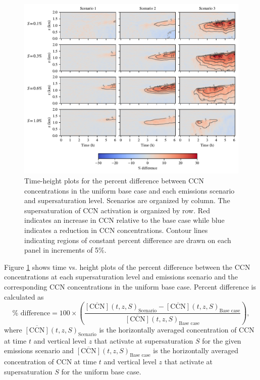 \documentclass[journal abbreviation, manuscript]{copernicus}
\begin{document}
\begin{figure}[!h]
	\centering
	\includegraphics[]{figures/height-time-ccn-pdiff-multi-scenario.pdf}
	\caption{Time-height plots for the percent difference between CCN concentrations in the uniform base case and each emissions scenario and supersaturation level. Scenarios are organized by column. The supersaturation of CCN activation is organized by row. Red indicates an increase in CCN relative to the base case while blue indicates a reduction in CCN concentrations. Contour lines indicating regions of constant percent difference are drawn on each panel in increments of 5\%.}
	\label{fig:time-height-ccn-pdiff}
\end{figure} 

Figure \ref{fig:time-height-ccn-pdiff} shows time vs. height plots of the percent difference between the CCN concentrations at each supersaturation level and emissions scenario and the corresponding CCN concentrations in the uniform base case. Percent difference is calculated as 
\begin{equation}
    \% \text{ difference} = 100\times\left(\frac{\overline{[\text{CCN}]}(t, z, S)_{\text{Scenario}} - \overline{[\text{CCN}]}(t, z, S)_{\text{Base case}}}{\overline{[\text{CCN}]}(t, z, S)_{\text{Base case}}}\right),
\end{equation}
where $\overline{[\text{CCN}]}(t, z,S)_{\text{Scenario}}$ is the horizontally averaged concentration of CCN at time $t$ and vertical level $z$ that activate at supersaturation $S$ for the given emissions scenario and $\overline{[\text{CCN}]}(t, z, S)_{\text{Base case}}$ is the horizontally averaged concentration of CCN at time $t$ and vertical level $z$ that activate at supersaturation $S$ for the uniform base case. 
\end{document}

